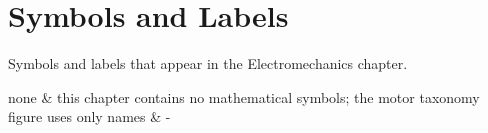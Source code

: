 \section*{Symbols and Labels}
Symbols and labels that appear in the Electromechanics chapter.
\begin{symtable}
\(\text{none}\) & this chapter contains no mathematical symbols; the motor taxonomy figure uses only names & - \\ \hline
\end{symtable}

